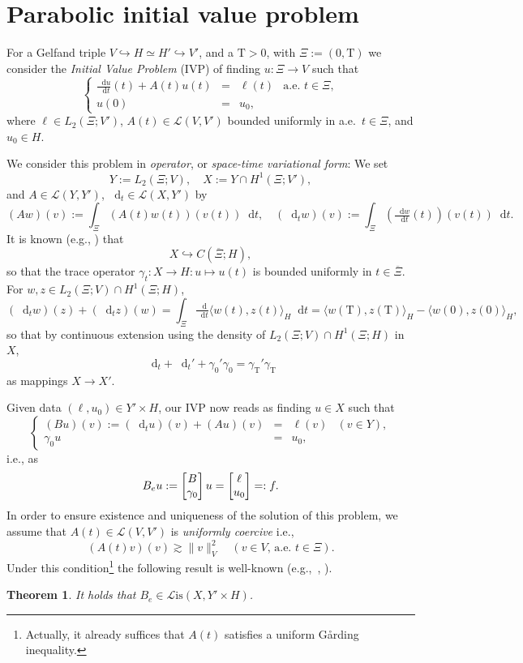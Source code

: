 \documentclass{amsart}
\newtheorem{theorem}{Theorem}[section]
\numberwithin{equation}{section}
\newcommand{\cL}{\mathcal L}
\newcommand{\Lis}{\cL\mathrm{is}}
\newcommand{\1}{\mathbb 1}
\newcommand*\diff{\mathop{}\!\mathrm{d}}
\newcommand{\be}{\begin{equation}}
\newcommand{\ee}{\end{equation}}
\begin{document}
\section{Parabolic initial value problem} \label{sec:ivp}
For a Gelfand triple $V \hookrightarrow H \simeq H' \hookrightarrow V'$, and a $\mathrm{T}>0$, with $\Xi:=(0,\mathrm{T})$ we consider the \emph{Initial Value Problem} (IVP) of finding $u\colon \Xi \rightarrow V$ such that
$$
\left\{
\begin{array}{rcll}
\tfrac{\diff u}{\diff t} (t)+A(t)u(t) & = & \ell(t) & \text{a.e. }t \in \Xi  , \\
u(0) & = & u_0,
\end{array}
\right.
$$
where $\ell \in L_2(\Xi;V')$, $A(t) \in \cL(V,V')$ bounded uniformly in a.e.~$t \in \Xi$, and $u_0 \in H$.


We consider this problem in \emph{operator}, or \emph{space-time variational form}: We set
$$
Y:=L_2(\Xi;V), \quad X:= Y \cap H^1(\Xi;V'), 
$$
and $A\in \cL(Y,Y')$, $\diff_t \in \cL(X,Y')$ by
$$
 (Aw)(v):=\int_\Xi (A(t)w(t))(v(t))\diff t,\quad (\diff_t w)(v):=\int_\Xi (\tfrac{\diff w}{\diff t} (t))(v(t)) \diff t.
 $$
It is known (e.g., \cite[Ch.~1, Thm.~3.1]{185}) that
\be \label{eq:embedding}
X \hookrightarrow C(\overline{\Xi};H),
\ee
so that the trace operator $\gamma_t\colon X \rightarrow H\colon u \mapsto u(t)$ is bounded uniformly in $t \in \overline{\Xi}$.
For $w, z \in L_2(\Xi;V) \cap H^1(\Xi;H)$,
$$
(\diff_t w)(z)+(\diff_t z)(w)=\int_\Xi \tfrac{\diff}{\diff t} \langle w(t),z(t)\rangle_H \diff t=\langle w(\mathrm{T}),z(\mathrm{T})\rangle_H-\langle w(0),z(0)\rangle_H,
$$
so that by continuous extension using the density of $L_2(\Xi;V) \cap H^1(\Xi;H)$ in $X$,
$$
\diff_t+\diff_t'+\gamma_0' \gamma_0=\gamma_{\mathrm{T}}' \gamma_{\mathrm{T}}
$$
as mappings $X \rightarrow X'$.

Given data $(\ell,u_0) \in Y' \times H$, our IVP now reads as finding $u \in X$ such that
$$
\left\{
\begin{array}{rcll}
(Bu)(v):=(\diff_t u)(v)+(Au)(v)&=&\ell(v) & (v \in Y),\\
\gamma_0 u &=& u_0,
\end{array}
\right.
$$
i.e., as
\be \label{eq:33}
B_e u:=\left[\begin{array}{@{}c@{}} B \\ \gamma_0 \end{array}\right] u=\left[\begin{array}{@{}c@{}} \ell \\ u_0\end{array}\right]=:f.
\ee
In order to ensure existence and uniqueness of the solution of this problem, we assume that $A(t) \in \cL(V,V')$ is
 \emph{uniformly coercive} i.e.,
$$
(A(t) v)(v) \gtrsim \|v\|_{V}^2\quad(v \in V,\, \text{a.e. } t \in \Xi).
$$
Under this condition\footnote{Actually, it already suffices that $A(t)$ satisfies a uniform G{\aa}rding inequality.} the following result is well-known (e.g.,~\cite[Ch.~3, Thm.~4.1]{185},
\cite[Ch.~IV, \S26]{314.9}).
\begin{theorem} It holds that  $B_e \in \Lis(X,Y' \times H)$.
\end{theorem}
\end{document}
